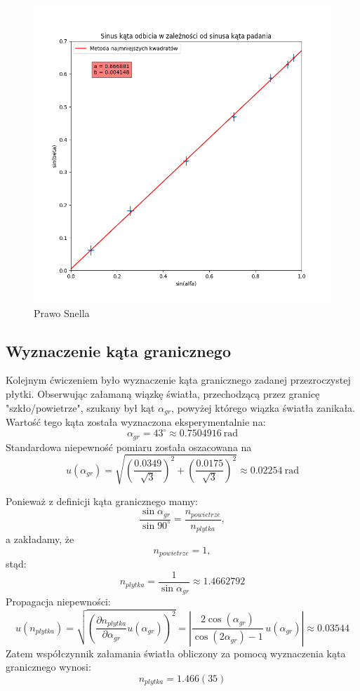 \documentclass[a4paper]{article}
\begin{document}
\begin{figure}[h]
\centering
\includegraphics[scale=0.7]{snell.png}
\caption{Prawo Snella}
\label{snell-wykres}
\end{figure}


\subsection{Wyznaczenie kąta granicznego}
Kolejnym ćwiczeniem było wyznaczenie kąta granicznego zadanej przezroczystej płytki.
Obserwując załamaną wiązkę światła, przechodzącą przez granicę "szkło/powietrze", szukany był kąt $\alpha_{gr}$, powyżej którego wiązka światła zanikała.
Wartość tego kąta została wyznaczona eksperymentalnie na: 
\[
\alpha_{gr} = 43^\circ \approx 0.7504916 \ \text{rad}
\]
Standardowa niepewność pomiaru została oszacowana na 
\[
u(\alpha_{gr}) = \sqrt{ \left( \frac{0.0349}{\sqrt{3}} \right)^2 + \left( \frac{0.0175}{\sqrt{3}} \right)^2}
\approx 0.02254 \ \text{rad}
\]

Ponieważ z definicji kąta granicznego mamy: 
\[ 
	\frac{\sin \alpha_{gr}}{\sin 90^\circ} = \frac{n_{powietrze}}{n_{plytka}} ,
\]
a zakładamy, że
\[ 
	n_{powietrze} = 1,
\]
stąd:
\[
	n_{plytka} = \frac{1}{\sin \alpha_{gr}} \approx 1.4662792
\]
Propagacja niepewności:
\[
	u(n_{plytka}) = \sqrt{\left( \frac{\partial n_{plytka}}{\partial \alpha_{gr}}u(\alpha_{gr})\right)^2} = 
	\left| \frac{2\cos(\alpha_{gr})}{\cos(2\alpha_{gr})-1} \, u(\alpha_{gr}) \right| \approx 0.03544
\]
Zatem współczynnik załamania światła obliczony za pomocą wyznaczenia kąta granicznego wynosi:
\[
	n_{plytka} = 1.466(35)
\]
\end{document}
